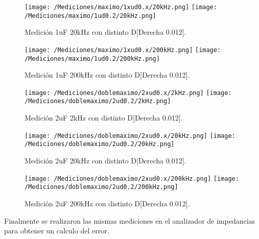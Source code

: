 \begin{figure}[H]
	\centering
	\texttt{[image: /Mediciones/maximo/1xud0.x/20kHz.png]}
	\texttt{[image: /Mediciones/maximo/1ud0.2/20kHz.png]}
\caption{Medición 1uF 20kHz con distinto D[Derecha 0.012].}
	\label{fig:fcon}
\end{figure}
\begin{figure}[H]
	\centering
	\texttt{[image: /Mediciones/maximo/1xud0.x/200kHz.png]}
	\texttt{[image: /Mediciones/maximo/1ud0.2/200kHz.png]}
\caption{Medición 1uF 200kHz con distinto D[Derecha 0.012].}
	\label{fig:fcon}
\end{figure}
\begin{figure}[H]
	\centering
	\texttt{[image: /Mediciones/doblemaximo/2xud0.x/2kHz.png]}
	\texttt{[image: /Mediciones/doblemaximo/2ud0.2/2kHz.png]}
\caption{Medición 2uF 2kHz con distinto D[Derecha 0.012].}
	\label{fig:fcon}
\end{figure}
\begin{figure}[H]
	\centering
	\texttt{[image: /Mediciones/doblemaximo/2xud0.x/20kHz.png]}
	\texttt{[image: /Mediciones/doblemaximo/2ud0.2/20kHz.png]}
\caption{Medición 2uF 20kHz con distinto D[Derecha 0.012].}
	\label{fig:fcon}
\end{figure}
\begin{figure}[H]
	\centering
	\texttt{[image: /Mediciones/doblemaximo/2xud0.x/200kHz.png]}
	\texttt{[image: /Mediciones/doblemaximo/2ud0.2/200kHz.png]}
\caption{Medición 2uF 200kHz con distinto D[Derecha 0.012].}
	\label{fig:fcon}
\end{figure}
Finalmente se realizaron las mismas mediciones en el analizador de impedancias para obtener un calculo del error.
